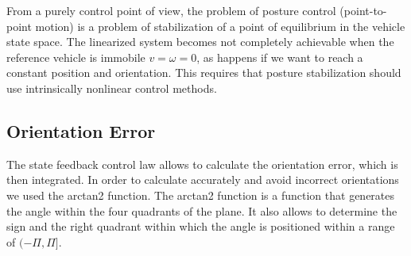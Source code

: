 \documentclass[a4paper,11pt,oneside]{book}
\begin{document}
From a purely control point of view, the problem of posture control (point-to-point motion) is a problem of stabilization of a point of equilibrium in the vehicle state space. The linearized system becomes not completely achievable when the reference vehicle is immobile $v = \omega = 0$, as happens if we want to reach a constant position and orientation. This requires that posture stabilization should use intrinsically nonlinear control methods.

\subsection {Orientation Error}
The state feedback control law allows to calculate the orientation error, which is then integrated. In order to calculate accurately and avoid incorrect orientations we used the arctan2 function. The arctan2 function is a function that generates the angle within the four quadrants of the plane. It also allows to determine the sign and the right quadrant within which the angle is positioned within a range of $(-\Pi,\Pi]$.
\end{document}
